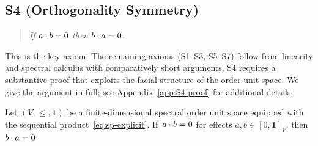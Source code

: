 \subsection*{S4 (Orthogonality Symmetry)}\label{subsec:S4}

\begin{quote}
\emph{If $\sp{a}{b} = 0$ then $\sp{b}{a} = 0$.}
\end{quote}

This is the key axiom. The remaining axioms (S1--S3, S5--S7) follow from
linearity and spectral calculus with comparatively short arguments. S4
requires a substantive proof that exploits the facial structure of the
order unit space. We give the argument in full; see
Appendix~\ref{app:S4-proof} for additional details.

\begin{theorem}\label{thm:S4}
Let $(V, \le, \mathbf{1})$ be a finite-dimensional spectral order unit
space equipped with the sequential product~\eqref{eq:sp-explicit}. If\,
$\sp{a}{b} = 0$ for effects $a,b \in [0,\mathbf{1}]_V$, then
$\sp{b}{a} = 0$.
\end{theorem}

